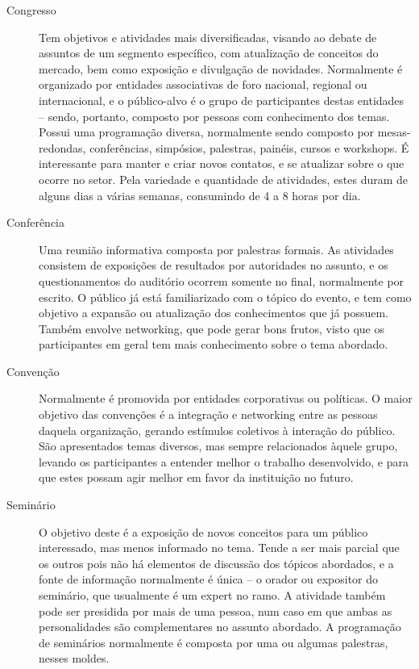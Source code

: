 \documentclass[12pt,a4paper,twoside,hyphens,english,brazil]{abntex2}
\begin{document}
\begin{description}
	\item[Congresso] Tem objetivos e atividades mais diversificadas, visando ao debate de assuntos de um segmento específico, com atualização de conceitos do mercado, bem como exposição e divulgação de novidades. Normalmente é organizado por entidades associativas de foro nacional, regional ou internacional, e o público-alvo é o grupo de participantes destas entidades -- sendo, portanto, composto por pessoas com conhecimento dos temas. Possui uma programação diversa, normalmente sendo composto por mesas-redondas, conferências, simpósios, palestras, painéis, cursos e workshops. É interessante para manter e criar novos contatos, e se atualizar sobre o que ocorre no setor. Pela variedade e quantidade de atividades, estes duram de alguns dias a várias semanas, consumindo de 4 a 8 horas por dia.
	
	\item[Conferência] Uma reunião informativa composta por palestras formais. As atividades consistem de exposições de resultados por autoridades no assunto, e os questionamentos do auditório ocorrem somente no final, normalmente por escrito. O público já está familiarizado com o tópico do evento, e tem como objetivo a expansão ou atualização dos conhecimentos que já possuem. Também envolve networking, que pode gerar bons frutos, visto que os participantes em geral tem mais conhecimento sobre o tema abordado. %
							
	\item[Convenção] Normalmente é promovida por entidades corporativas ou políticas. O maior objetivo das convenções é a integração e networking entre as pessoas daquela organização, gerando estímulos coletivos à interação do público. São apresentados temas diversos, mas sempre relacionados àquele grupo, levando os participantes a entender melhor o trabalho desenvolvido, e para que estes possam agir melhor em favor da instituição no futuro.
	
	\item[Seminário] O objetivo deste é a exposição de novos conceitos para um público interessado, mas menos informado no tema. Tende a ser mais parcial que os outros pois não há elementos de discussão dos tópicos abordados, e a fonte de informação normalmente é única -- o orador ou expositor do seminário, que usualmente é um expert no ramo. A atividade também pode ser presidida por mais de uma pessoa, num caso em que ambas as personalidades são complementares no assunto abordado. A programação de seminários normalmente é composta por uma ou algumas palestras, nesses moldes.
					

\end{description}
\end{document}
